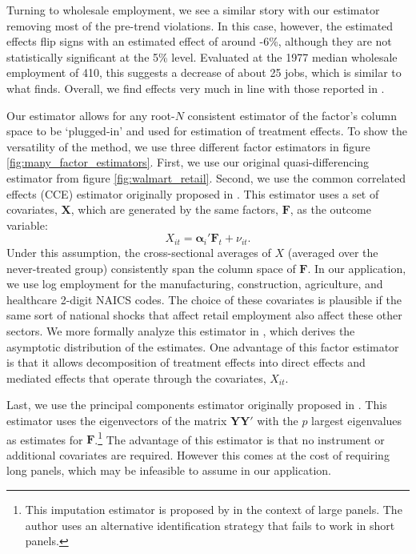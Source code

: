 \documentclass[12pt]{article}
\begin{document}
Turning to wholesale employment, we see a similar story with our estimator removing most of the pre-trend violations. In this case, however, the estimated effects flip signs with an estimated effect of around -6\%, although they are not statistically significant at the 5\% level. Evaluated at the 1977 median wholesale employment of 410, this suggests a decrease of about 25 jobs, which is similar to what \citet{basker2005job} finds. Overall, we find effects very much in line with those reported in \citet{basker2005job}.

Our estimator allows for any root-$N$ consistent estimator of the factor's column space to be `plugged-in' and used for estimation of treatment effects. To show the versatility of the method, we use three different factor estimators in figure \ref{fig:many_factor_estimators}. First, we use our original quasi-differencing estimator from figure \ref{fig:walmart_retail}. Second, we use the common correlated effects (CCE) estimator originally proposed in \citet{pesaran2006estimation}. This estimator uses a set of covariates, $\bm X$, which are generated by the same factors, $\bm{F}$, as the outcome variable:
\begin{equation}
  X_{it} = \bm\alpha_i' \bm{F}_t + \nu_{it}.
\end{equation}
Under this assumption, the cross-sectional averages of $X$ (averaged over the never-treated group) consistently span the column space of $\bm{F}$.  In our application, we use log employment for the manufacturing, construction, agriculture, and healthcare 2-digit NAICS codes. The choice of these covariates is plausible if the same sort of national shocks that affect retail employment also affect these other sectors. We more formally analyze this estimator in \citet{Brown_Butts_Westerlund_2023}, which derives the asymptotic distribution of the estimates. One advantage of this factor estimator is that it allows decomposition of treatment effects into direct effects and mediated effects that operate through the covariates, $X_{it}$.

Last, we use the principal components estimator originally proposed in \citet{Bai_2009}. This estimator uses the eigenvectors  of the matrix $\bm Y \bm Y'$ with the $p$ largest eigenvalues as estimates for $\bm{F}$.\footnote{This imputation estimator is proposed by \citet{xu2017generalized} in the context of large panels. The author uses an alternative identification strategy that fails to work in short panels.} The advantage of this estimator is that no instrument or additional covariates are required. However this comes at the cost of requiring long panels, which may be infeasible to assume in our application.
\end{document}
